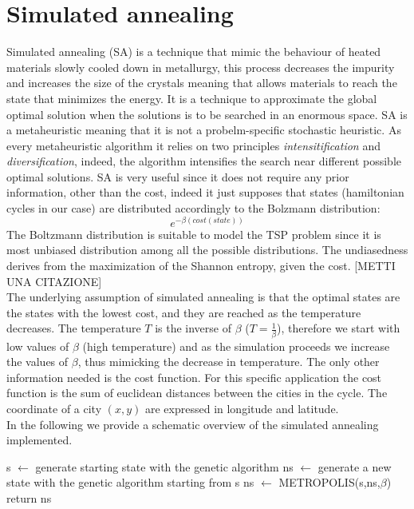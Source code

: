 \documentclass{article}
\begin{document}
\section{Simulated annealing}
Simulated annealing (SA) is a technique that mimic the behaviour of heated materials slowly cooled down in metallurgy, this process decreases the impurity and increases the size of the crystals meaning that allows materials to reach the state that minimizes the energy. It is a technique to approximate the global optimal solution when the solutions is to be searched in an enormous space. SA is a metaheuristic meaning that it is not a probelm-specific stochastic heuristic. As every metaheuristic algorithm it relies on two principles \textit{intensitification} and \textit{diversification}, indeed, the algorithm intensifies the search near different possible optimal solutions.
SA is very useful since it does not require any prior information, other than the cost, indeed it just supposes that states (hamiltonian cycles in our case) are distributed accordingly to the Bolzmann distribution:
\begin{equation}
e^{- \beta (cost(state))}
\end{equation}
The Boltzmann distribution is suitable to model the TSP problem since it is most unbiased distribution among all the possible distributions. The undiasedness derives from the maximization of the Shannon entropy, given the cost. [METTI UNA CITAZIONE]\\
The underlying assumption of simulated annealing is that the optimal states are the states with the lowest cost, and they are reached as the temperature decreases. The temperature $T$ is the inverse of $\beta$ ($T = \frac{1}{\beta}$), therefore we start with low values of $\beta$ (high temperature) and as the simulation proceeds we increase the values of $\beta$, thus mimicking the decrease in temperature.
The only other information needed is the cost function. For this specific application the cost function is the sum of euclidean distances between the cities in the cycle. The coordinate of a city $(x,y)$ are expressed in longitude and latitude.\\
In the following we provide a schematic overview of the simulated annealing implemented.

\begin{algorithm}[H]
    \begin{algorithmic}[1]
        \State s $\leftarrow$ generate starting state with the genetic algorithm
         	 \State ns $\leftarrow$ generate a new state with the genetic algorithm starting from s
         	\State ns $\leftarrow$ METROPOLIS(s,ns,$\beta$)
         	\EndFor
        \EndFor
        \State return ns
       \EndFunction
\end{algorithmic}
\end{algorithm}
\end{document}
